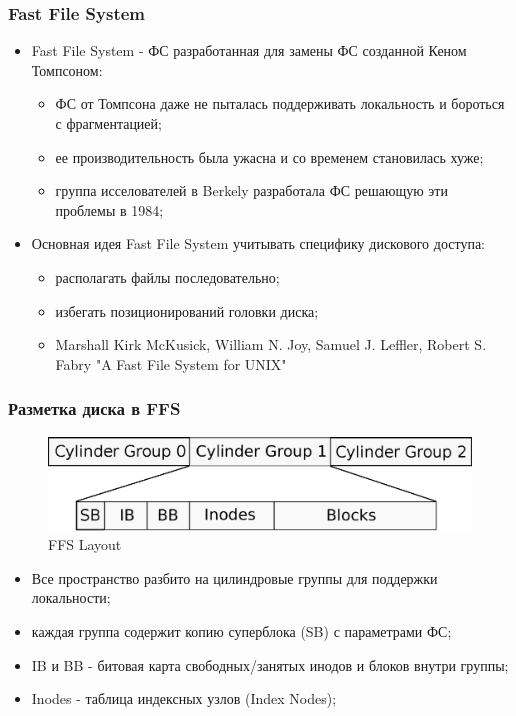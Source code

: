 \begin{frame}
\frametitle{Fast File System}
\begin{itemize}
  \item Fast File System - ФС разработанная для замены ФС созданной Кеном Томпсоном:
    \begin{itemize}
      \item ФС от Томпсона даже не пыталась поддерживать локальность и бороться с фрагментацией;
      \item ее производительность была ужасна и со временем становилась хуже;
      \item группа исселователей в Berkely разработала ФС решающую эти проблемы в 1984;
    \end{itemize}
  \item Основная идея Fast File System учитывать специфику дискового доступа:
    \begin{itemize}
      \item располагать файлы последовательно;
      \item избегать позиционирований головки диска;
      \item Marshall Kirk McKusick, William N. Joy, Samuel J. Leffler, Robert S. Fabry "A Fast File System for UNIX"
    \end{itemize}
\end{itemize}
\end{frame}

\begin{frame}
\frametitle{Разметка диска в FFS}
\begin{figure}
  \centering\includegraphics[width=.6\linewidth]{ffs-layout}
  \caption{FFS Layout}
\end{figure}
\begin{itemize}
  \item Все пространство разбито на цилиндровые группы для поддержки локальности;
  \item каждая группа содержит копию суперблока (SB) с параметрами ФС;
  \item IB и BB - битовая карта свободных/занятых инодов и блоков внутри группы;
  \item Inodes - таблица индексных узлов (Index Nodes);
\end{itemize}
\end{frame}

